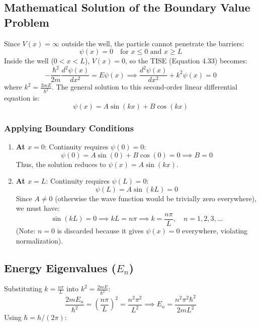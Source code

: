 \subsection{Mathematical Solution of the Boundary Value Problem}
Since $V(x) = \infty$ outside the well, the particle cannot penetrate the barriers:
\begin{equation}
    \psi(x) = 0 \quad \text{for } x \le 0 \text{ and } x \ge L
\end{equation}
Inside the well ($0 < x < L$), $V(x) = 0$, so the TISE (Equation 4.33) becomes:
\begin{equation}
    -\frac{\hbar^2}{2m}\frac{d^2\psi(x)}{dx^2} = E\psi(x) \implies \frac{d^2\psi(x)}{dx^2} + k^2\psi(x) = 0
\end{equation}
where $k^2 = \frac{2mE}{\hbar^2}$. The general solution to this second-order linear differential equation is:
\begin{equation}
    \psi(x) = A\sin(kx) + B\cos(kx)
\end{equation}

\subsubsection{Applying Boundary Conditions}
\begin{enumerate}
    \item \textbf{At $x = 0$}: Continuity requires $\psi(0) = 0$:
    \begin{equation}
        \psi(0) = A\sin(0) + B\cos(0) = 0 \implies B = 0
    \end{equation}
    Thus, the solution reduces to $\psi(x) = A\sin(kx)$.
    
    \item \textbf{At $x = L$}: Continuity requires $\psi(L) = 0$:
    \begin{equation}
        \psi(L) = A\sin(kL) = 0
    \end{equation}
    Since $A \neq 0$ (otherwise the wave function would be trivially zero everywhere), we must have:
    \begin{equation}
        \sin(kL) = 0 \implies kL = n\pi \implies k = \frac{n\pi}{L}, \quad n = 1, 2, 3, \dots
    \end{equation}
    (Note: $n=0$ is discarded because it gives $\psi(x)=0$ everywhere, violating normalization).
\end{enumerate}

\subsection{Energy Eigenvalues (\texorpdfstring{$E_n$}{En})}
Substituting $k = \frac{n\pi}{L}$ into $k^2 = \frac{2mE}{\hbar^2}$:
\begin{equation}
    \frac{2mE_n}{\hbar^2} = \left(\frac{n\pi}{L}\right)^2 = \frac{n^2\pi^2}{L^2} \implies E_n = \frac{n^2\pi^2\hbar^2}{2m L^2}
\end{equation}
Using $\hbar = h / (2\pi)$:

